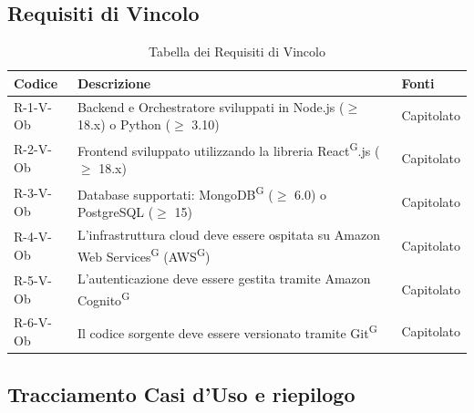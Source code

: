 \documentclass[a4paper, 11pt]{article}
\renewcommand{\arraystretch}{1.4} %
\begin{document}
\subsection{Requisiti di Vincolo}
\renewcommand{\arraystretch}{1.5}
\begin{longtable}[c]{ >{\centering\arraybackslash}m{2.5cm} >{\centering\arraybackslash}m{8.3cm} >{\centering\arraybackslash}m{3.5cm} }
    \caption{Tabella dei Requisiti di Vincolo} \\
    \rowcolor{AccentDark}
    \color{white}\textbf{Codice} & \color{white}\textbf{Descrizione} & \color{white}\textbf{Fonti} \\
    \endhead
    R-1-V-Ob & Backend e Orchestratore sviluppati in Node.js ($\geq$ 18.x) o Python ($\geq$ 3.10) & Capitolato \\
    R-2-V-Ob & Frontend sviluppato utilizzando la libreria React\textsuperscript{G}.js ($\geq$ 18.x) & Capitolato \\
    R-3-V-Ob & Database supportati: MongoDB\textsuperscript{G} ($\geq$ 6.0) o PostgreSQL ($\geq$ 15) & Capitolato \\
    R-4-V-Ob & L'infrastruttura cloud deve essere ospitata su Amazon Web Services\textsuperscript{G} (AWS\textsuperscript{G}) & Capitolato \\
    R-5-V-Ob & L'autenticazione deve essere gestita tramite Amazon Cognito\textsuperscript{G} & Capitolato \\
    R-6-V-Ob & Il codice sorgente deve essere versionato tramite Git\textsuperscript{G} & Capitolato \\
\end{longtable}


\subsection{Tracciamento Casi d'Uso e riepilogo}
\end{document}
